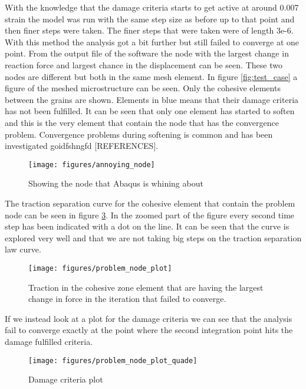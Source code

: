 \documentclass[convergence.tex]{subfiles}
\begin{document}
With the knowledge that the damage criteria starts to get active at around 0.007 strain the model was run with the same step size as before up to that point and then finer steps were taken. The finer steps that were taken were of length 3e-6. With this method the analysis got a bit further but still failed to converge at one point. From the output file of the software the node with the largest change in reaction force and largest chance in the displacement can be seen. These two nodes are different but both in the same mesh element. In figure \ref{fig:test_case} a figure of the meshed microstructure can be seen. Only the cohesive elements between the grains are shown. Elements in blue means that their damage criteria has not been fulfilled. It can be seen that only one element has started to soften and this is the very element that contain the node that has the convergence problem. Convergence problems during softening is common and has been investigated goidfshngfd [REFERENCES].

\begin{figure}[ht]
\centering
\texttt{[image: figures/annoying\_node]}
\caption{Showing the node that Abaqus is whining about}
\label{fig:annoying_node}
\end{figure}

The traction separation curve for the cohesive element that contain the problem node can be seen in figure \ref{fig:prob_node_plot}.  In the zoomed part of the figure every second time step has been indicated with a dot on the line. It can be seen that the curve is explored very well and that we are not taking big steps on the traction separation law curve. 

\begin{figure}[ht]
\centering
\texttt{[image: figures/problem\_node\_plot]}
\caption{Traction in the cohesive zone element that are having the largest change in force in the iteration that failed to converge.}
\label{fig:prob_node_plot}
\end{figure}

If we instead look at a plot for the damage criteria we can see that the analysis fail to converge exactly at the point where the second integration point hits the damage fulfilled criteria.

\begin{figure}[ht]
\centering
\texttt{[image: figures/problem\_node\_plot\_quade]}
\caption{Damage criteria plot}
\label{fig:prob_node_plot}
\end{figure}
\end{document}
